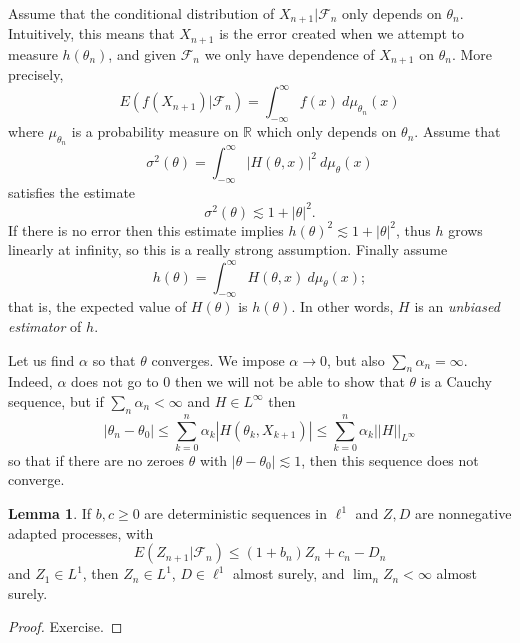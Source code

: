 \documentclass[12pt]{book}
\newcommand{\RR}{\mathbb{R}}
\newcommand{\dfn}[1]{\emph{#1}\index{#1}}
\theoremstyle{definition}
\newtheorem{lemma}[theorem]{Lemma}
\begin{document}
Assume that the conditional distribution of $X_{n+1}|\mathcal F_n$ only depends on $\theta_n$.
Intuitively, this means that $X_{n+1}$ is the error created when we attempt to measure $h(\theta_n)$, and given $\mathcal F_n$ we only have dependence of $X_{n+1}$ on $\theta_n$.
More precisely,
$$E(f(X_{n+1})|\mathcal F_n) = \int_{-\infty}^\infty f(x) ~d\mu_{\theta_n}(x)$$
where $\mu_{\theta_n}$ is a probability measure on $\RR$ which only depends on $\theta_n$.
Assume that
$$\sigma^2(\theta) = \int_{-\infty}^\infty |H(\theta, x)|^2 ~d\mu_\theta(x)$$
satisfies the estimate
$$\sigma^2(\theta) \lesssim 1 + |\theta|^2.$$
If there is no error then this estimate implies $h(\theta)^2 \lesssim 1 + |\theta|^2$, thus $h$ grows linearly at infinity, so this is a really strong assumption.
Finally assume
$$h(\theta) = \int_{-\infty}^\infty H(\theta, x) ~d\mu_\theta(x);$$
that is, the expected value of $H(\theta)$ is $h(\theta)$.
In other words, $H$ is an \dfn{unbiased estimator} of $h$.

Let us find $\alpha$ so that $\theta$ converges.
We impose $\alpha \to 0$, but also $\sum_n \alpha_n = \infty$.
Indeed, $\alpha$ does not go to $0$ then we will not be able to show that $\theta$ is a Cauchy sequence, but if $\sum_n \alpha_n < \infty$ and $H \in L^\infty$ then
$$|\theta_n - \theta_0| \leq \sum_{k=0}^n \alpha_k |H(\theta_k, X_{k+1})| \leq \sum_{k=0}^n \alpha_k ||H||_{L^\infty}$$
so that if there are no zeroes $\theta$ with $|\theta - \theta_0| \lesssim 1$, then this sequence does not converge.

\begin{lemma}
If $b,c \geq 0$ are deterministic sequences in $\ell^1$ and $Z,D$ are nonnegative adapted processes, with
$$E(Z_{n+1}|\mathcal F_n) \leq (1 + b_n)Z_n + c_n - D_n$$
and $Z_1 \in L^1$, then $Z_n \in L^1$, $D \in \ell^1$ almost surely, and $\lim_n Z_n < \infty$ almost surely.
\end{lemma}
\begin{proof}
Exercise.
\end{proof}
\end{document}
